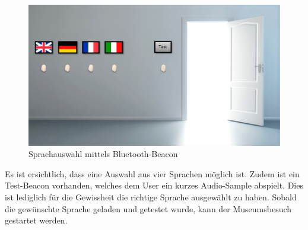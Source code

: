 \begin{figure}[H]
	\begin{center}
		\includegraphics[width=140mm]{data/BeaconSpracherkennung.png}
		\caption[Sprachauswahl mittels Bluetooth-Beacon]{Sprachauswahl mittels Bluetooth-Beacon} %
		\label{fig:SprachauswahlBeacon}
	\end{center}
\end{figure}

Es ist ersichtlich, dass eine Auswahl aus vier Sprachen möglich ist. Zudem ist ein Test-Beacon vorhanden, welches dem User ein kurzes Audio-Sample abspielt. Dies ist lediglich für die Gewissheit die richtige Sprache ausgewählt zu haben. Sobald die gewünschte Sprache geladen und getestet wurde, kann der Museumsbesuch gestartet werden.
